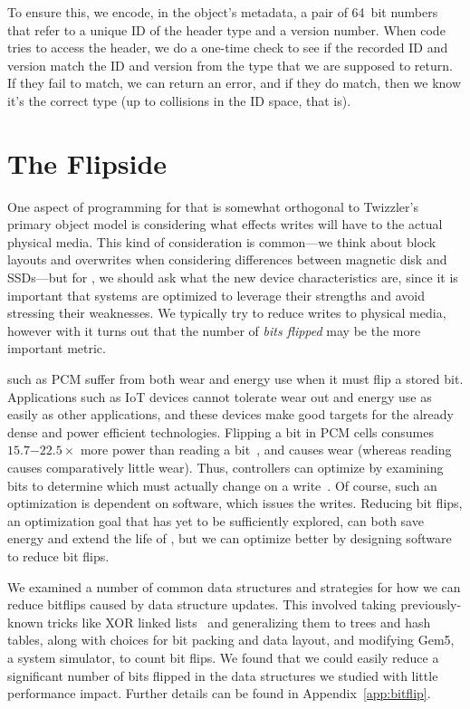 To ensure this, we encode, in the object's metadata, a pair of 64~bit numbers that refer to a unique ID of the header
type and a version number. When code tries to access the header, we do a one-time check to see if the
recorded ID and version match the ID and version from the type that we are supposed to return. If they fail to match, we
can return an error, and if they do match, then we know it's the correct type (up to collisions in the ID space, that is).

\section{The Flipside}

One aspect of programming for \NVM that is somewhat orthogonal to Twizzler's primary object model is considering what
effects writes will have to the actual physical media. This kind of consideration is common---we think about block
layouts and overwrites when considering differences between magnetic disk and SSDs---but for \NVM, we should ask what
the new device characteristics are, since
it is important that systems are optimized to leverage their
strengths and avoid stressing their weaknesses. We typically try to reduce writes to physical media, however with
\NVM it turns out that the number of \emph{bits flipped} may be the more important metric.

\NVMs such as PCM suffer from both wear and energy use when it must flip a stored bit. Applications such as IoT devices
cannot tolerate wear out and energy use as easily as other applications, and these devices make good targets for the
already dense and power efficient \NVM technologies.
Flipping a bit in PCM cells consumes $15.7\mathit{-}22.5\times$ more power than reading a
bit~\cite{dhiman_pdram:_2009,lee_architecting_2009,xiangyu_dong_nvsim:_2012,qureshi_scalable_2009}, and causes wear
(whereas reading causes comparatively little wear).
Thus, controllers can optimize by examining bits to determine which must actually change on a write~\cite{yang:iscas07}.
Of course, such an optimization is dependent on software, which issues the writes.
Reducing bit flips, an optimization goal that has yet to be
sufficiently explored, can both save energy and extend the life of \NVM, but we can optimize better by
designing software to reduce bit flips.

We examined a number of common data structures and strategies for how we can reduce bitflips caused
by data structure updates. This involved taking previously-known tricks like XOR linked lists~\cite{xorll} and
generalizing them to trees and hash tables, along with choices for bit packing and data layout, and modifying Gem5, a
system simulator, to count bit flips. We found that we could easily reduce a significant number of bits flipped in the
data structures we studied with little performance impact. Further details can be found in Appendix~\ref{app:bitflip}.


